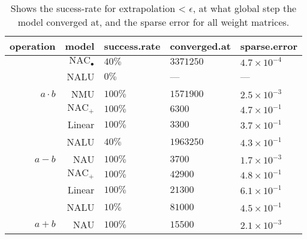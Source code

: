 \begin{table}[H]

\caption{\label{tab:function-task-static-defaults}Shows the sucess-rate for extrapolation < $\epsilon$, at what global step the model converged at, and the sparse error for all weight matrices.}
\centering
\begin{tabular}{rrlll}
\toprule
operation & model & success.rate & converged.at & sparse.error\\
\midrule
 & $\mathrm{NAC}_{\bullet}$ & $40\%$ & $3371250$ & $4.7 \times 10^{-4}$\\

 & NALU & $0\%$ & --- & ---\\

\multirow{-3}{*}{\raggedleft\arraybackslash ${a \cdot b}$} & NMU & $100\%$ & $1571900$ & $2.5 \times 10^{-3}$\\
\cmidrule{1-5}
 & $\mathrm{NAC}_{+}$ & $100\%$ & $6300$ & $4.7 \times 10^{-1}$\\

 & Linear & $100\%$ & $3300$ & $3.7 \times 10^{-1}$\\

 & NALU & $40\%$ & $1963250$ & $4.3 \times 10^{-1}$\\

\multirow{-4}{*}{\raggedleft\arraybackslash $a - b$} & NAU & $100\%$ & $3700$ & $1.7 \times 10^{-3}$\\
\cmidrule{1-5}
 & $\mathrm{NAC}_{+}$ & $100\%$ & $42900$ & $4.8 \times 10^{-1}$\\

 & Linear & $100\%$ & $21300$ & $6.1 \times 10^{-1}$\\

 & NALU & $10\%$ & $81000$ & $4.5 \times 10^{-1}$\\

\multirow{-4}{*}{\raggedleft\arraybackslash $a + b$} & NAU & $100\%$ & $15500$ & $2.1 \times 10^{-3}$\\
\bottomrule
\end{tabular}
\end{table}
